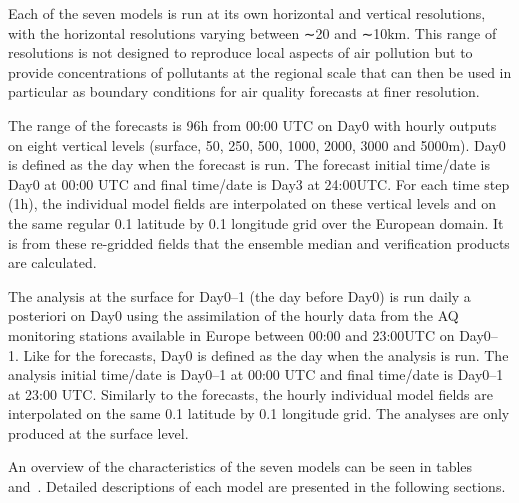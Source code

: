\documentclass[9pt]{article}
\begin{document}
\noindent{}Each of the seven models is run at its own horizontal and vertical resolutions, with the horizontal resolutions varying between ∼20 and ∼10km. 
This range of resolutions is not designed to reproduce local aspects of air pollution but to provide concentrations of pollutants at the regional scale that can then be used in particular as boundary conditions for air quality forecasts at finer resolution.%

The range of the forecasts is 96h from 00:00 UTC on Day0 with hourly outputs on eight vertical levels (surface, 50, 250, 500, 1000, 2000, 3000 and 5000m). 
Day0 is defined as the day when the forecast is run. 
The forecast initial time/date is Day0 at 00:00 UTC and final time/date is Day3 at 24:00UTC. 
For each time step (1h), the individual model fields are interpolated on these vertical levels and on the same regular 0.1\textdegree{} latitude by 0.1\textdegree{} longitude grid over the European domain. 
It is from these re-gridded fields that the ensemble median and verification products are calculated.%

The analysis at the surface for Day0–1 (the day before Day0) is run daily a posteriori on Day0 using the assimilation of the hourly data from the AQ monitoring stations available in Europe between 00:00 and 23:00UTC on Day0– 1. 
Like for the forecasts, Day0 is defined as the day when the analysis is run. 
The analysis initial time/date is Day0–1 at 00:00 UTC and final time/date is Day0–1 at 23:00 UTC. 
Similarly to the forecasts, the hourly individual model fields are interpolated on the same 0.1\textdegree{} latitude by 0.1\textdegree{} longitude grid. 
The analyses are only produced at the surface level.%

An overview of the characteristics of the seven models can be seen in tables~ and~.
Detailed descriptions of each model are presented in the following sections.%
\end{document}
